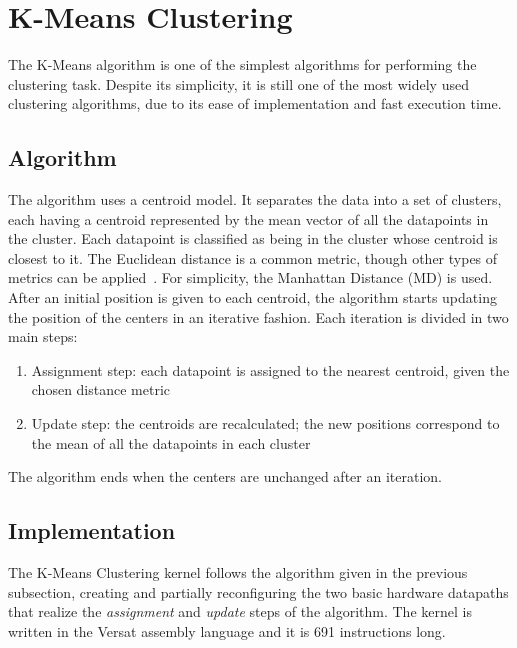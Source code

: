 \section{K-Means Clustering}
\label{section:kmeans}

The K-Means algorithm is one of the simplest algorithms for performing
the clustering task. Despite its simplicity, it is still one of the
most widely used clustering algorithms, due to its ease of
implementation and fast execution time.

\subsection{Algorithm}
\label{subsection:kmeansAlgorithm}

The algorithm uses a centroid model. It separates the data into a set
of clusters, each having a centroid represented by the mean vector of
all the datapoints in the cluster. Each datapoint is classified as
being in the cluster whose centroid is closest to it. The Euclidean
distance is a common metric, though other types of metrics can be
applied~\cite{Estlick2001}. For simplicity, the Manhattan Distance
(MD) is used. After an initial position is given to each centroid, the
algorithm starts updating the position of the centers in an iterative
fashion. Each iteration is divided in two main steps:
\begin{enumerate}
	\item Assignment step: each datapoint is assigned to the
          nearest centroid, given the chosen distance metric
	\item Update step: the centroids are recalculated; the new
          positions correspond to the mean of all the datapoints in
          each cluster
\end{enumerate}
The algorithm ends when the centers are unchanged after an iteration.

\subsection{Implementation}
\label{subsection:kmeansImplementation}

The K-Means Clustering kernel follows the algorithm given in the
previous subsection, creating and partially reconfiguring the two
basic hardware datapaths that realize the {\em assignment} and {\em
  update} steps of the algorithm. The kernel is written in the Versat
assembly language and it is 691 instructions long.


